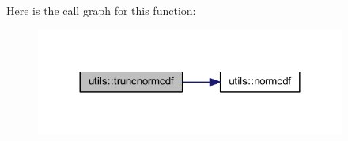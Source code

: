 Here is the call graph for this function\+:
\nopagebreak
\begin{figure}[H]
\begin{center}
\leavevmode
\includegraphics[width=288pt]{namespaceutils_ac313e8810c0e461aa91b7299c8fba4be_cgraph}
\end{center}
\end{figure}


